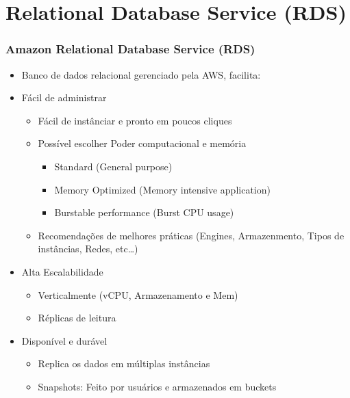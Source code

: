 \section{Relational Database Service (RDS)}

\begin{frame}[allowframebreaks]
	\frametitle{Amazon Relational Database Service (RDS)}
	\begin{itemize}
		\item Banco de dados relacional gerenciado pela AWS, facilita:
			\begin{itemize}
			\end{itemize}
		\item Fácil de administrar
			\begin{itemize}
				\item Fácil de instânciar e pronto em poucos cliques
				\item Possível escolher Poder computacional e memória
					\begin{itemize}
						\item Standard (General purpose)
						\item Memory Optimized (Memory intensive application)
						\item Burstable performance (Burst CPU usage)
					\end{itemize}
				\item Recomendações de melhores práticas (Engines, Armazenmento, Tipos de instâncias, Redes, etc\dots)
			\end{itemize}
		\framebreak
		\item Alta Escalabilidade
			\begin{itemize}
				\item Verticalmente (vCPU, Armazenamento e Mem)
				\item Réplicas de leitura
			\end{itemize}
		\item Disponível e durável
			\begin{itemize}
				\item Replica os dados em múltiplas instâncias
				\item Snapshots: Feito por usuários e armazenados em buckets

\end{itemize}
\end{itemize}
\end{frame}
